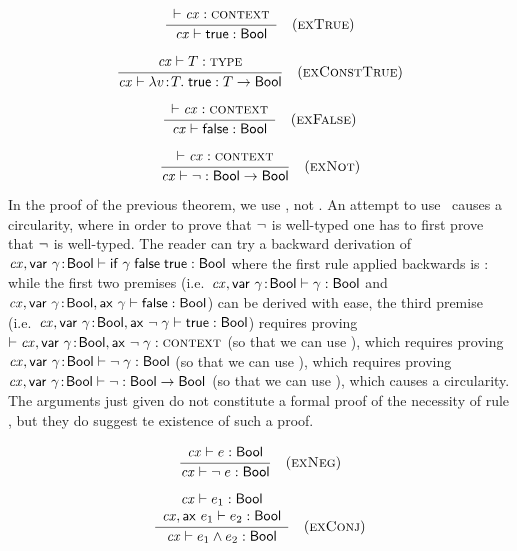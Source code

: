 \begin{theorem}\label{thm-etrue}
{\rm
\[
\frac{\begin{array}{c}\vdash\mathit{cx}:\textsc{context}\end{array}}{\mathit{cx}\vdash\mathsf{true}:\mathsf{Bool}}\quad\mbox{(\textsc{exTrue})}
\]
}
\end{theorem}

\begin{theorem}\label{thm-econsttrue}
{\rm
\[
\frac{\begin{array}{c}\mathit{cx}\vdash T:\textsc{type}\end{array}}{\mathit{cx}\vdash\lambda v\!:\!T.\;\mathsf{true}:T\to\mathsf{Bool}}\quad\mbox{(\textsc{exConstTrue})}
\]
}
\end{theorem}

\begin{theorem}\label{thm-efalse}
{\rm
\[
\frac{\begin{array}{c}\vdash\mathit{cx}:\textsc{context}\end{array}}{\mathit{cx}\vdash\mathsf{false}:\mathsf{Bool}}\quad\mbox{(\textsc{exFalse})}
\]
}
\end{theorem}

\begin{theorem}\label{thm-enot}
{\rm
\[
\frac{\begin{array}{c}\vdash\mathit{cx}:\textsc{context}\end{array}}{\mathit{cx}\vdash\neg:\mathsf{Bool}\to\mathsf{Bool}}\quad\mbox{(\textsc{exNot})}
\]
}
\end{theorem}

In the proof of the previous theorem, we use \ReifO, not \Reif. An attempt to
use \Reif\ causes a circularity, where in order to prove that $\neg$ is
well-typed one has to first prove that $\neg$ is well-typed. The reader can
try a backward derivation of
$\mathit{cx},\mathsf{var}\ \gamma\!:\!\mathsf{Bool}\vdash\mathsf{if}\;\gamma\;\mathsf{false}\;\mathsf{true}:\mathsf{Bool}$
where the first rule applied backwards is \Reif: while the first two premises
(i.e.\ $\mathit{cx},\mathsf{var}\ \gamma\!:\!\mathsf{Bool}\vdash\gamma:\mathsf{Bool}$ and
$\mathit{cx},\mathsf{var}\ \gamma\!:\!\mathsf{Bool},\mathsf{ax}\ \gamma\vdash\mathsf{false}:\mathsf{Bool}$)
can be derived with ease, the third premise (i.e.\
$\mathit{cx},\mathsf{var}\ \gamma\!:\!\mathsf{Bool},\mathsf{ax}\ \neg\;\gamma\vdash\mathsf{true}:\mathsf{Bool}$) requires proving
$\vdash\mathit{cx},\mathsf{var}\ \gamma\!:\!\mathsf{Bool},\mathsf{ax}\ \neg\;\gamma:\textsc{context}$ (so that
we can use \Retrue), which requires proving
$\mathit{cx},\mathsf{var}\ \gamma\!:\!\mathsf{Bool}\vdash\neg\;\gamma:\mathsf{Bool}$ (so that we
can use \Rcxax), which requires proving
$\mathit{cx},\mathsf{var}\ \gamma\!:\!\mathsf{Bool}\vdash\neg:\mathsf{Bool}\to\mathsf{Bool}$ (so
that we can use \Reapp), which causes a circularity. The arguments just given
do not constitute a formal proof of the necessity of rule \ReifO, but they do
suggest te existence of such a proof.

\begin{theorem}\label{thm-enega}
{\rm
\[
\frac{\begin{array}{c}\mathit{cx}\vdash e:\mathsf{Bool}\end{array}}{\mathit{cx}\vdash\neg\;e:\mathsf{Bool}}\quad\mbox{(\textsc{exNeg})}
\]
}
\end{theorem}

\begin{theorem}\label{thm-econj}
{\rm
\[
\frac{\begin{array}{c}\mathit{cx}\vdash e_1:\mathsf{Bool}\\\mathit{cx},\mathsf{ax}\ e_1\vdash e_2:\mathsf{Bool}\end{array}}{\mathit{cx}\vdash e_1\wedge e_2:\mathsf{Bool}}\quad\mbox{(\textsc{exConj})}
\]
}
\end{theorem}


